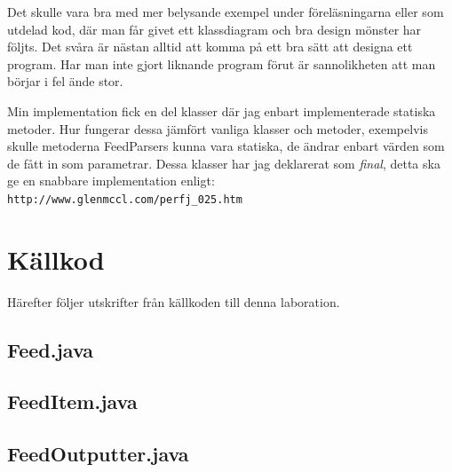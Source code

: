 \documentclass[titlepage, twoside, a4paper, 12pt]{article}
\begin{document}
Det skulle vara bra med mer belysande exempel under föreläsningarna
eller som utdelad kod, där man får givet ett klassdiagram och bra
design mönster har följts. Det svåra är nästan alltid att komma på ett
bra sätt att designa ett program. Har man inte gjort liknande program
förut är sannolikheten att man börjar i fel ände stor.

Min implementation fick en del klasser där jag enbart implementerade
statiska metoder. Hur fungerar dessa jämfört vanliga klasser och
metoder, exempelvis skulle metoderna FeedParsers kunna vara statiska,
de ändrar enbart värden som de fått in som parametrar. Dessa klasser
har jag deklarerat som \textit{final}, detta ska ge en snabbare
implementation enligt:\\
\verb!http://www.glenmccl.com/perfj_025.htm!\\


\newpage
\appendix
{}
\section{Källkod}\label{Kallkod}
Härefter följer utskrifter från källkoden till denna laboration.

\subsection{Feed.java}\label{Feed.java}
\begin{footnotesize}
  
\end{footnotesize}

\newpage
\subsection{FeedItem.java}\label{FeedItem.java}
\begin{footnotesize}
  
\end{footnotesize}

\newpage
\subsection{FeedOutputter.java}\label{FeedOutputter.java}
\begin{footnotesize}
  
\end{footnotesize}

\newpage
\end{document}

